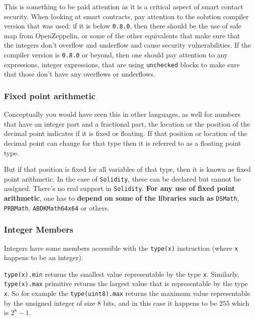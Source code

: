 This is something to be paid attention as it is a critical aspect of
smart contact security. When looking at smart contracts, pay attention
to the solution compiler version that was used: if it is below
\texttt{0.8.0}, then there should be the use of safe map from
OpenZeppelin, or some of the other equivalents that make sure that the
integers don't overflow and underflow and cause security
vulnerabilities. If the compiler version is \texttt{0.8.0} or beyond,
then one should pay attention to any expressions, integer expressions,
that are using \texttt{unchecked} blocks to make sure that those don't
have any overflows or underflows.

\subsubsection{Fixed point arithmetic}\label{fixed-point-arithmetic}

Conceptually you would have seen this in other languages, as well for
numbers that have an integer part and a fractional part, the location or
the position of the decimal point indicates if it is fixed or floating.
If that position or location of the decimal point can change for that
type then it is referred to as a floating point type.

But if that position is fixed for all variables of that type, then it is
known as fixed point arithmetic. In the case of \texttt{Solidity}, these
can be declared but cannot be assigned. There's no real support in
\texttt{Solidity}. \textbf{For any use of fixed point arithmetic}, one
has to \textbf{depend on some of the libraries such as} \texttt{DSMath},
\texttt{PRBMath}, \texttt{ABDKMath64x64} or others.

\subsubsection{Integer Members}\label{integer-members}

Integers have some members accessible with the \texttt{type(x)}
instruction (where \texttt{x} happens to be an integer).

\texttt{type(x).min} returns the smallest value representable by the
type \texttt{x}. Similarly, \texttt{type(x).max} primitive returns the
largest value that is representable by the type \texttt{x}. So for
example the \texttt{type(uint8).max} returns the maximum value
representable by the unsigned integer of size 8 bits, and in this case
it happens to be $255$ which is $2^8 - 1$.

